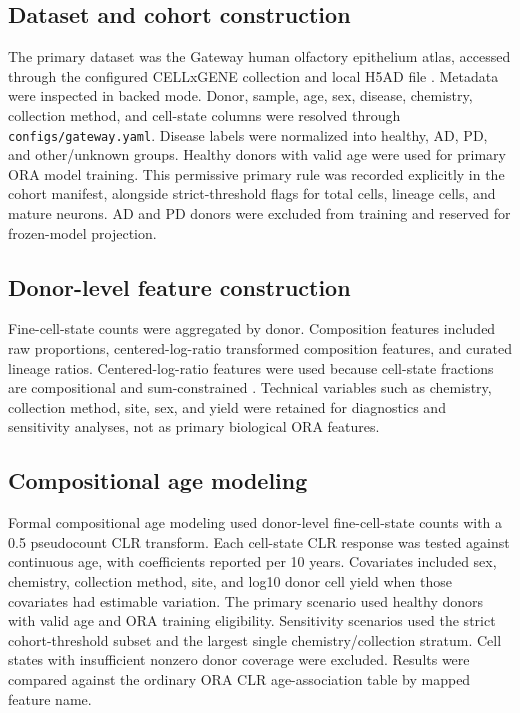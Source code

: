 \documentclass[11pt]{article}
\begin{document}
\subsection{Dataset and cohort construction}

The primary dataset was the Gateway human olfactory epithelium atlas, accessed through the configured CELLxGENE collection and local H5AD file \citep{gateway2026}. Metadata were inspected in backed mode. Donor, sample, age, sex, disease, chemistry, collection method, and cell-state columns were resolved through \texttt{configs/gateway.yaml}. Disease labels were normalized into healthy, AD, PD, and other/unknown groups. Healthy donors with valid age were used for primary ORA model training. This permissive primary rule was recorded explicitly in the cohort manifest, alongside strict-threshold flags for total cells, lineage cells, and mature neurons. AD and PD donors were excluded from training and reserved for frozen-model projection.

\subsection{Donor-level feature construction}

Fine-cell-state counts were aggregated by donor. Composition features included raw proportions, centered-log-ratio transformed composition features, and curated lineage ratios. Centered-log-ratio features were used because cell-state fractions are compositional and sum-constrained \citep{aitchison1982}. Technical variables such as chemistry, collection method, site, sex, and yield were retained for diagnostics and sensitivity analyses, not as primary biological ORA features.

\subsection{Compositional age modeling}

Formal compositional age modeling used donor-level fine-cell-state counts with a 0.5 pseudocount CLR transform. Each cell-state CLR response was tested against continuous age, with coefficients reported per 10 years. Covariates included sex, chemistry, collection method, site, and log10 donor cell yield when those covariates had estimable variation. The primary scenario used healthy donors with valid age and ORA training eligibility. Sensitivity scenarios used the strict cohort-threshold subset and the largest single chemistry/collection stratum. Cell states with insufficient nonzero donor coverage were excluded. Results were compared against the ordinary ORA CLR age-association table by mapped feature name.
\end{document}
